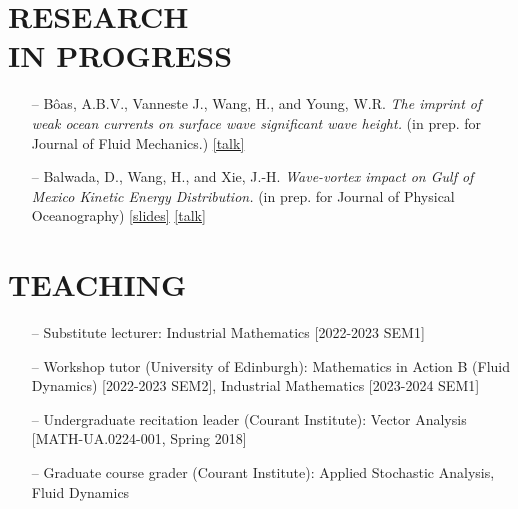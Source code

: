 \documentclass[margin]{res}
\begin{document}
\begin{resume}
\section{{\normalfont RESEARCH\\IN PROGRESS}}
\begin{itemize}

\item[--] B\^{o}as, A.B.V., Vanneste J.,  Wang, H., and Young, W.R. \textit{The imprint of weak ocean currents on surface wave significant wave height.}  (in prep. for Journal of Fluid Mechanics.) \href{https://www.youtube.com/watch?v=migsRGIAB-c}{[talk]}
\item[--] Balwada, D., Wang, H., and Xie, J.-H. \textit{Wave-vortex impact on Gulf of Mexico Kinetic Energy Distribution.} (in prep. for Journal of Physical Oceanography) \href{https://hannnwang.github.io/slide_trr_2023.pdf}{[slides]}  \href{https://www.youtube.com/watch?v=3HQ-iV7y3gI}{[talk]}    
\end{itemize}

\section{{\normalfont TEACHING}}
\begin{itemize}[leftmargin=*,noitemsep]
\item[--]{Substitute lecturer: Industrial Mathematics [2022-2023 SEM1]}
\item[--]{Workshop tutor (University of Edinburgh): Mathematics in Action B (Fluid Dynamics) [2022-2023 SEM2], Industrial Mathematics [2023-2024 SEM1]}
\item[--]{Undergraduate recitation leader  (Courant Institute): Vector Analysis [MATH-UA.0224-001, Spring 2018]}
\item[--]{Graduate course grader  (Courant Institute): Applied Stochastic Analysis, Fluid Dynamics}
\end{itemize}

\end{resume}
\end{document}
